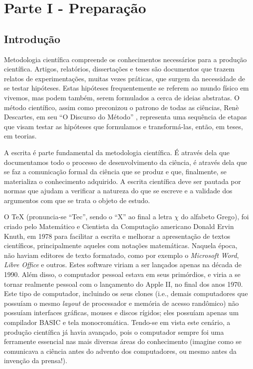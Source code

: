 \chapter{Parte I - Preparação}
\label{cap:parteI}

\section{Introdução}
\label{sec:intro}

Metodologia científica compreende os conhecimentos necessários para a produção científica. Artigos, relatórios, dissertações e teses são documentos que trazem relatos de experimentações, muitas vezes práticas, que surgem da necessidade de se testar hipóteses. Estas hipóteses frequentemente se referem ao mundo físico em vivemos, mas podem também, serem formulados a cerca de ideias abstratas. O método científico, assim como preconizou o patrono de todas as ciências, Renè Descartes, em seu ``O Discurso do Método'' \cite{descartes}, representa uma sequência de etapas que visam testar as hipóteses que formulamos e transformá-las, então, em teses, em teorias.

A escrita é parte fundamental da metodologia científica. É através dela que documentamos todo o processo de desenvolvimento da ciência, é através dela que se faz a comunicação formal da ciência que se produz e que, finalmente, se materializa o conhecimento adquirido. A escrita científica deve ser pautada por normas que ajudam a verificar a natureza do que se escreve e a validade dos argumentos com que se trata o objeto de estudo.

O \TeX{} (pronuncia-se ``Tec'', sendo o ``X'' ao final a letra $\chi$ do alfabeto Grego), foi criado pelo Matemático e Cientista da Computação americano Donald Ervin Knuth, em 1978 para facilitar a escrita e melhorar a apresentação de textos científicos, principalmente aqueles com notações matemáticas. Naquela época, não haviam editores de texto formatado, como por exemplo o \textit{Microsoft Word}, \textit{Libre Office} e outros. Estes software viriam a ser lançados apenas na década de 1990. Além disso, o computador pessoal estava em seus primórdios, e viria a se tornar realmente pessoal com o lançamento do Apple II, no final dos anos 1970. Este tipo de computador, incluindo os seus clones (i.e., demais computadores que possuíam o mesmo \textit{layout} de processador e memória de acesso randômico) não possuíam interfaces gráficas, mouses e discos rígidos; eles possuíam apenas um compilador BASIC e tela monocromática. Tendo-se em vista este cenário, a produção científica já havia avançado, pois o computador sempre foi uma ferramente essencial nas mais diversas áreas do conhecimento (imagine como se comunicava a ciência antes do advento dos computadores, ou mesmo antes da invenção da prensa!). 

